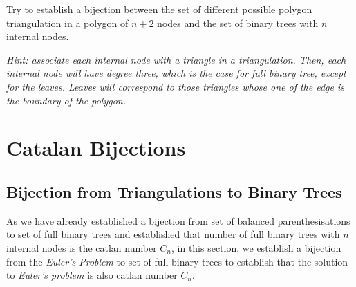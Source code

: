 
\begin{exercise}
\item Try to establish a bijection between the set of different possible polygon triangulation in a polygon of $n+2$ nodes and the set of binary trees with $n$ internal nodes.

\textit{Hint: associate each internal node with a triangle in a triangulation. Then, each internal node will have degree three, which is the case for full binary tree, except for the leaves. Leaves will correspond to those triangles whose one of the edge is the boundary of the polygon.}
\end{exercise}


\section{Catalan Bijections}
\label{week2:discuss}

\subsection{Bijection from Triangulations to Binary Trees}
As we have already established a bijection from set of balanced parenthesisations to set of full binary trees and established that number of full binary trees with $n$ internal nodes is the catlan number $C_n$, in this section, we establish a bijection from the \emph{Euler's Problem} to set of full binary trees to establish that the solution to \emph{Euler's problem} is also catlan number $C_n$.

